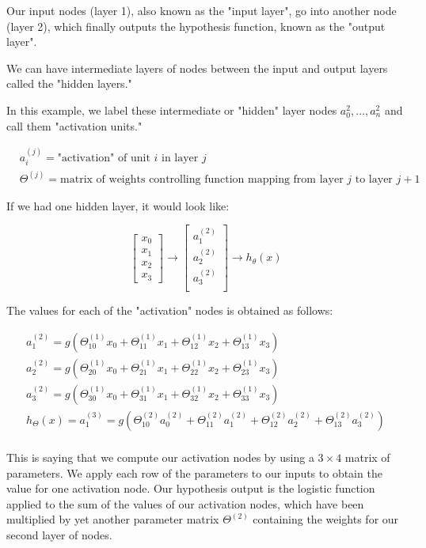 \documentclass[10pt,a4paper,UTF8]{article}
\begin{document}
Our input nodes (layer 1), also known as the "input layer", go into another node (layer 2), which finally outputs the hypothesis function, known as the "output layer".

We can have intermediate layers of nodes between the input and output layers called the "hidden layers."

In this example, we label these intermediate or "hidden" layer nodes \(a_{0}^{2},\ldots ,a_{n}^{2}\) and call them "activation units."

\begin{align*}& a_i^{(j)} = \text{"activation" of unit $i$ in layer $j$} \\& \Theta^{(j)} = \text{matrix of weights controlling function mapping from layer $j$ to layer $j+1$}\end{align*}

If we had one hidden layer, it would look like:

\begin{equation}
\label{eq:2}
\begin{bmatrix}x_0 \\ x_1 \\ x_2 \\ x_3\end{bmatrix}\rightarrow\begin{bmatrix}a_1^{(2)} \\ a_2^{(2)} \\ a_3^{(2)} \\ \end{bmatrix}\rightarrow h_\theta(x)
\end{equation}

The values for each of the "activation" nodes is obtained as follows:

\begin{align*} a_1^{(2)} = g(\Theta_{10}^{(1)}x_0 + \Theta_{11}^{(1)}x_1 + \Theta_{12}^{(1)}x_2 + \Theta_{13}^{(1)}x_3) \\ a_2^{(2)} = g(\Theta_{20}^{(1)}x_0 + \Theta_{21}^{(1)}x_1 + \Theta_{22}^{(1)}x_2 + \Theta_{23}^{(1)}x_3) \\ a_3^{(2)} = g(\Theta_{30}^{(1)}x_0 + \Theta_{31}^{(1)}x_1 + \Theta_{32}^{(1)}x_2 + \Theta_{33}^{(1)}x_3) \\ h_\Theta(x) = a_1^{(3)} = g(\Theta_{10}^{(2)}a_0^{(2)} + \Theta_{11}^{(2)}a_1^{(2)} + \Theta_{12}^{(2)}a_2^{(2)} + \Theta_{13}^{(2)}a_3^{(2)}) \\ \end{align*}

This is saying that we compute our activation nodes by using a \(3\times 4\) matrix of parameters. We apply each row of the parameters to our inputs to obtain the value for one activation node. Our hypothesis output is the logistic function applied to the sum of the values of our activation nodes, which have been multiplied by yet another parameter matrix \(\Theta^{(2)}\) containing the weights for our second layer of nodes.
\end{document}
